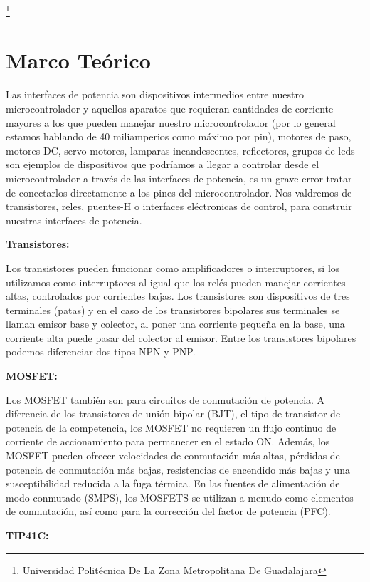 \documentclass[11pt,a4paper]{article}
\begin{document}
\footnote{Universidad Politécnica De La Zona Metropolitana De Guadalajara} 

\newpage

\section{Marco Teórico}


Las interfaces de potencia son dispositivos intermedios entre nuestro microcontrolador y aquellos aparatos que requieran cantidades de corriente mayores a los que pueden manejar nuestro microcontrolador (por lo general estamos hablando de 40 miliamperios como máximo por pin), motores de paso, motores DC, servo motores, lamparas incandescentes, reflectores, grupos de leds son ejemplos de dispositivos que podríamos a llegar a controlar desde el microcontrolador a través de las interfaces de potencia, es un grave error tratar de conectarlos directamente a los pines del microcontrolador. Nos valdremos de transistores, reles, puentes-H o interfaces eléctronicas de control, para construir nuestras interfaces de potencia.

\textbf{Transistores:}

Los transistores pueden funcionar como amplificadores o interruptores, si los utilizamos como interruptores al igual que los relés pueden manejar corrientes altas, controlados por corrientes bajas. Los transistores son dispositivos de tres terminales (patas) y en el caso de los transistores bipolares sus terminales se llaman emisor base y colector, al poner una corriente pequeña en la base, una corriente alta puede pasar del colector al emisor. Entre los transistores bipolares podemos diferenciar dos tipos NPN y PNP.

\textbf{MOSFET:}

Los MOSFET también son para circuitos de conmutación de potencia. A diferencia de los transistores de unión bipolar (BJT), el tipo de transistor de potencia de la competencia, los MOSFET no requieren un flujo continuo de corriente de accionamiento para permanecer en el estado ON. Además, los MOSFET pueden ofrecer velocidades de conmutación más altas, pérdidas de potencia de conmutación más bajas, resistencias de encendido más bajas y una susceptibilidad reducida a la fuga térmica. En las fuentes de alimentación de modo conmutado (SMPS), los MOSFETS se utilizan a menudo como elementos de conmutación, así como para la corrección del factor de potencia (PFC).

\textbf{TIP41C:}
\end{document}
